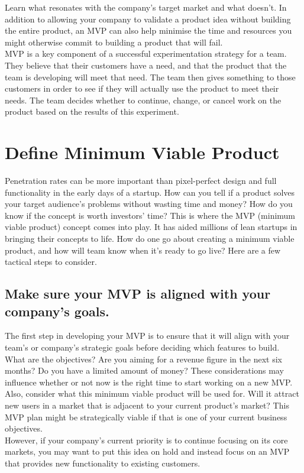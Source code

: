 \documentclass[paper=a4, fontsize=11pt]{scrartcl}
\numberwithin{equation}{section}		%
\numberwithin{figure}{section}			%
\numberwithin{table}{section}				%
\begin{document}
Learn what resonates with the company's target market and what doesn't. In addition to allowing your company to validate a product idea without building the entire product, an MVP can also help minimise the time and resources you might otherwise commit to building a product that will fail.\\
MVP is a key component of a successful experimentation strategy for a team. They believe that their customers have a need, and that the product that the team is developing will meet that need. The team then gives something to those customers in order to see if they will actually use the product to meet their needs. The team decides whether to continue, change, or cancel work on the product based on the results of this experiment.
\pagebreak

\section{Define Minimum Viable Product}
Penetration rates can be more important than pixel-perfect design and full functionality in the early days of a startup. How can you tell if a product solves your target audience's problems without wasting time and money? How do you know if the concept is worth investors' time? This is where the MVP (minimum viable product) concept comes into play. It has aided millions of lean startups in bringing their concepts to life.
How do one go about creating a minimum viable product, and how will team know when it's ready to go live? Here are a few tactical steps to consider.
\subsection{Make sure your MVP is aligned with your company's goals.}
The first step in developing your MVP is to ensure that it will align with your team's or company's strategic goals before deciding which features to build.\\
What are the objectives? Are you aiming for a revenue figure in the next six months? Do you have a limited amount of money? These considerations may influence whether or not now is the right time to start working on a new MVP.
Also, consider what this minimum viable product will be used for. Will it attract new users in a market that is adjacent to your current product's market? This MVP plan might be strategically viable if that is one of your current business objectives.\\
However, if your company's current priority is to continue focusing on its core markets, you may want to put this idea on hold and instead focus on an MVP that provides new functionality to existing customers.
\newpage
\end{document}
